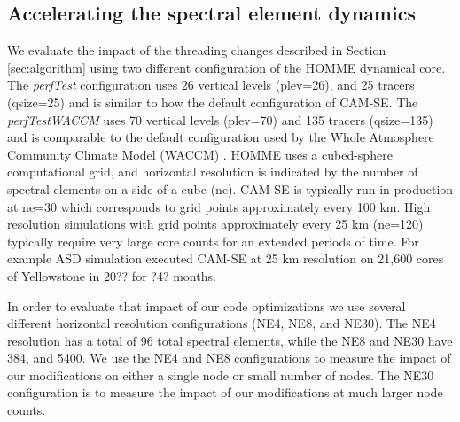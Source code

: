 \subsection{Accelerating the spectral element dynamics}\label{sec:homme-results}

We evaluate the impact of the threading changes described in Section \ref{sec:algorithm} using two different configuration of the HOMME dynamical core.  The {\em perfTest} configuration uses 26 vertical levels (plev=26), and 25 tracers (qsize=25) and is similar to how the default configuration of CAM-SE.  The {\em perfTestWACCM} uses 70 vertical levels (plev=70) and 135 tracers (qsize=135) and is comparable to the default configuration used by the Whole Atmosphere Community Climate Model (WACCM) \cite{waccm}.  HOMME uses a cubed-sphere computational grid, and horizontal resolution is indicated by the number of spectral elements on a side of a cube (ne). CAM-SE is typically run in production at ne=30 which corresponds to grid points approximately every 100 km.  High resolution simulations with grid points approximately every 25 km (ne=120) typically require very large core counts for an extended periods of time.   For example ASD simulation \cite{small2014} executed CAM-SE at 25 km resolution on 21,600 cores of Yellowstone in {\color{red} 20?? for ?4? months}.


 In order to evaluate that impact of our code optimizations we use several different horizontal resolution configurations (NE4, NE8, and NE30). The NE4 resolution has a total of 96 total spectral elements, while the NE8 and NE30 have 384, and 5400.  We use the NE4 and NE8 configurations to measure the impact of our modifications on either a single node or small number of nodes.  The NE30 configuration is to measure the impact of our modifications at much larger node counts.  



